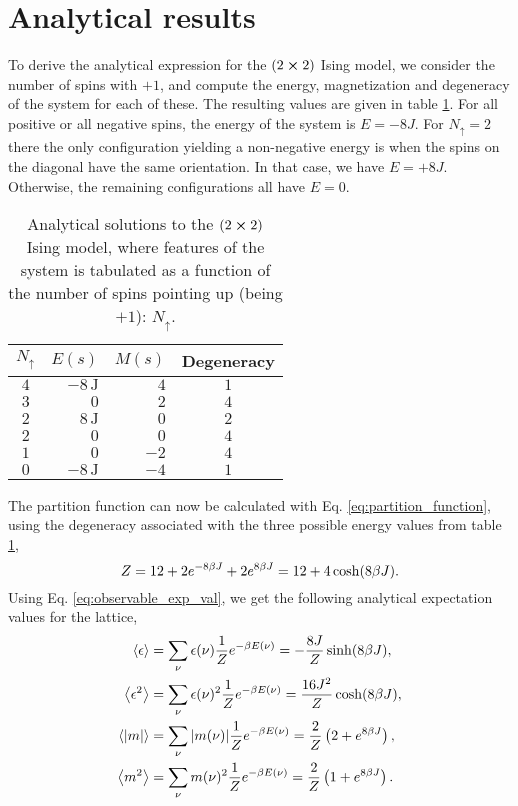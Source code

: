 \appendix 

\section{Analytical results} \label{app:analytical_expressions}
To derive the analytical expression for the $(2\cross2)$ Ising model, we consider the number of spins with $+1$, and compute the energy, magnetization and degeneracy of the system for each of these. The resulting values are given in table \ref{tab:2d_configurations}. For all positive or all negative spins, the energy of the system is $E=-8J$. For $N_\uparrow=2$ there the only configuration yielding a non-negative energy is when the spins on the diagonal have the same orientation. In that case, we have $E=+8J$. Otherwise, the remaining configurations all have $E=0$.    
\begin{table}[h!]
    \begin{tabular}{crrc}
    $N_\uparrow$ & $E(s)$ & $M(s)$ & Degeneracy \\ \hline
    $4$ & $-8\,\mathrm{J}$ & $4$ & $1$ \\
    $3$ & $0$ & $2$ & $4$ \\
    $2$ & $8\,\mathrm{J}$ & $0$ & $2$ \\
    $2$ & $0$ & $0$ & $4$ \\
    $1$ & $0$ & $-2$ & $4$ \\
    $0$ & $-8\,\mathrm{J}$ & $-4$ & $1$
    \end{tabular}
    \caption{Analytical solutions to the $(2\cross2)$ Ising model, where features of the system is tabulated as a function of the number of spins pointing up (being $+1$): $N_\uparrow$.}
    \label{tab:2d_configurations}
\end{table}
The partition function can now be calculated with Eq. \eqref{eq:partition_function}, using the degeneracy associated with the three possible energy values from table \ref{tab:2d_configurations},
\begin{equation}\label{eq:analytical_partition_func}
    Z = 12 + 2 e^{-8\beta J} + 2 e^{8\beta J} = 12 + 4 \cosh(8\beta J).
\end{equation}
Using Eq. \eqref{eq:observable_exp_val}, we get the following analytical expectation values for the lattice,
\begin{align}
    \expval{\epsilon} &= \sum_\nu \epsilon(\nu) \frac{1}{Z} e^{-\beta E(\nu)} = -\frac{8J}{Z}\sinh(8\beta J), \label{eq:analytical_avg_energy} \\ 
    \expval{\epsilon^2} &= \sum_\nu \epsilon(\nu)^2 \frac{1}{Z} e^{-\beta E(\nu)} = \frac{16 J^2}{Z}\cosh(8\beta J),\label{eq:analytical_avg_energy_squared} \\ 
    \expval{\abs{m}} &= \sum_\nu \abs{m(\nu)} \frac{1}{Z}e^{-\beta E(\nu)} = \frac{2}{Z}\left( 2 + e^{8\beta J} \right),\label{eq:analytical_avg_absolute_mag} \\ 
    \expval{m^2} &= \sum_\nu m(\nu)^2 \frac{1}{Z} e^{-\beta E(\nu)} = \frac{2}{Z}\left( 1 + e^{8\beta J} \right). \label{eq:analytical_avg_mag_squared}
\end{align}
